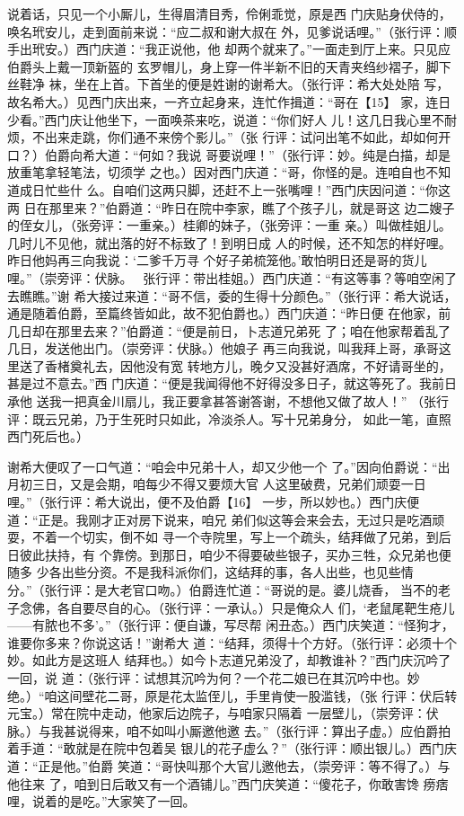 \documentclass[UTF8,scheme=chinese,11pt,linespread=1.4]{ctexbook}
\makeatletter
\newenvironment{diben}[1]
  {\list{}{\listparindent 2em
    \itemindent\listparindent
    \rightmargin 0em  %
    \leftmargin 0em  %
    \parsep \z@ \@plus\p@}%
   \item\relax}
  {\endlist}
\makeatother
\begin{document}
\begin{diben}
正说着话，只见一个小厮儿，生得眉清目秀，伶俐乖觉，原是西
门庆贴身伏侍的，唤名玳安儿，走到面前来说：“应二叔和谢大叔在
外，见爹说话哩。”（张行评：顺手出玳安。）西门庆道：“我正说他，他
却两个就来了。”一面走到厅上来。只见应伯爵头上戴一顶新盔的
玄罗帽儿，身上穿一件半新不旧的天青夹绉纱褶子，脚下丝鞋净
袜，坐在上首。下首坐的便是姓谢的谢希大。（张行评：希大处处陪
写，故名希大。）见西门庆出来，一齐立起身来，连忙作揖道：“哥在【15】
家，连日少看。”西门庆让他坐下，一面唤茶来吃，说道：“你们好人
儿！这几日我心里不耐烦，不出来走跳，你们通不来傍个影儿。”（张
行评：试问出笔不如此，却如何开口？）伯爵向希大道：“何如？我说
哥要说哩！”（张行评：妙。纯是白描，却是放重笔拿轻笔法，切须学
之也。）因对西门庆道：“哥，你怪的是。连咱自也不知道成日忙些什
么。自咱们这两只脚，还赶不上一张嘴哩！”西门庆因问道：“你这两
日在那里来？”伯爵道：“昨日在院中李家，瞧了个孩子儿，就是哥这
边二嫂子的侄女儿，（张旁评：一重亲。）桂卿的妹子，（张旁评：一重
亲。）叫做桂姐儿。几时儿不见他，就出落的好不标致了！到明日成
人的时候，还不知怎的样好哩。昨日他妈再三向我说：‘二爹千万寻
个好子弟梳笼他。’敢怕明日还是哥的货儿哩。”（崇旁评：伏脉。　
张行评：带出桂姐。）西门庆道：“有这等事？等咱空闲了去瞧瞧。”谢
希大接过来道：“哥不信，委的生得十分颜色。”（张行评：希大说话，
通是随着伯爵，至篇终皆如此，故不犯伯爵也。）西门庆道：“昨日便
在他家，前几日却在那里去来？”伯爵道：“便是前日，卜志道兄弟死
了；咱在他家帮着乱了几日，发送他出门。（崇旁评：伏脉。）他娘子
再三向我说，叫我拜上哥，承哥这里送了香楮奠礼去，因他没有宽
转地方儿，晚夕又没甚好酒席，不好请哥坐的，甚是过不意去。”西
门庆道：“便是我闻得他不好得没多日子，就这等死了。我前日承他
送我一把真金川扇儿，我正要拿甚答谢答谢，不想他又做了故人！”
（张行评：既云兄弟，乃于生死时只如此，冷淡杀人。写十兄弟身分，
如此一笔，直照西门死后也。）

谢希大便叹了一口气道：“咱会中兄弟十人，却又少他一个
了。”因向伯爵说：“出月初三日，又是会期，咱每少不得又要烦大官
人这里破费，兄弟们顽耍一日哩。”（张行评：希大说出，便不及伯爵【16】
一步，所以妙也。）西门庆便道：“正是。我刚才正对房下说来，咱兄
弟们似这等会来会去，无过只是吃酒顽耍，不着一个切实，倒不如
寻一个寺院里，写上一个疏头，结拜做了兄弟，到后日彼此扶持，有
个靠傍。到那日，咱少不得要破些银子，买办三牲，众兄弟也便随多
少各出些分资。不是我科派你们，这结拜的事，各人出些，也见些情
分。”（张行评：是大老官口吻。）伯爵连忙道：“哥说的是。婆儿烧香，
当不的老子念佛，各自要尽自的心。（张行评：一承认。）只是俺众人
们，‘老鼠尾靶生疮儿——有脓也不多’。”（张行评：便自谦，写尽帮
闲丑态。）西门庆笑道：“怪狗才，谁要你多来？你说这话！”谢希大
道：“结拜，须得十个方好。（张行评：必须十个妙。如此方是这班人
结拜也。）如今卜志道兄弟没了，却教谁补？”西门庆沉吟了一回，说
道：（张行评：试想其沉吟为何？一个花二娘已在其沉吟中也。妙
绝。）“咱这间壁花二哥，原是花太监侄儿，手里肯使一股滥钱，（张
行评：伏后转元宝。）常在院中走动，他家后边院子，与咱家只隔着
一层壁儿，（崇旁评：伏脉。）与我甚说得来，咱不如叫小厮邀他邀
去。”（张行评：算出子虚。）应伯爵拍着手道：“敢就是在院中包着吴
银儿的花子虚么？”（张行评：顺出银儿。）西门庆道：“正是他。”伯爵
笑道：“哥快叫那个大官儿邀他去，（崇旁评：等不得了。）与他往来
了，咱到日后敢又有一个酒铺儿。”西门庆笑道：“傻花子，你敢害馋
痨痞哩，说着的是吃。”大家笑了一回。


\end{diben}
\end{document}
